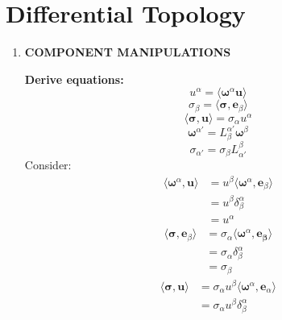 \documentclass[9pt]{report}
\begin{document}
\chapter{Differential Topology}
\begin{enumerate}
  \item \textbf{COMPONENT MANIPULATIONS}

  \textbf{Derive equations:}
  \begin{equation}
    u^\alpha = \langle \boldsymbol{\omega}^\alpha \boldsymbol{u} \rangle
  \end{equation}
  \begin{equation}
    \sigma_\beta = \langle \boldsymbol{\sigma}, \boldsymbol{e}_\beta \rangle
  \end{equation}
  \begin{equation}
    \langle \boldsymbol{\sigma}, \boldsymbol{u} \rangle = \sigma_\alpha u^\alpha
  \end{equation}
  \begin{equation}
    \boldsymbol{\omega}^{\alpha'} = L^{\alpha'}_\beta \boldsymbol{\omega}^\beta 
  \end{equation}
  \begin{equation}
    \sigma_{\alpha'} = \sigma_\beta L^\beta_{\alpha'}
  \end{equation}
  Consider:
  \[
    \begin{align}
      \langle \boldsymbol{\omega}^\alpha, \boldsymbol{u} \rangle &= u^\beta \langle \boldsymbol{\omega}^\alpha, \boldsymbol{e}_\beta \rangle \\
                                                                 &= u^\beta \delta^\alpha_\beta \\
                                                                 &= u^\alpha
    \end{align}
  \]
  \[
    \begin{align}
      \langle \boldsymbol{\sigma}, \boldsymbol{e}_\beta \rangle &= \sigma_\alpha \langle \boldsymbol{\omega}^\alpha, \boldsymbol{e_\beta} \rangle \\
      &= \sigma_\alpha \delta^\alpha_\beta \\
      &= \sigma_\beta
    \end{align}
  \]
  \[
  \]
  \[
    \begin{align}
      \langle \boldsymbol{\sigma}, \boldsymbol{u} \rangle &= \sigma_\alpha u^\beta \langle \boldsymbol{\omega}^\alpha, \boldsymbol{e}_\alpha \rangle\\
                                                          &= \sigma_\alpha u^\beta \delta^\alpha_\beta \\

\end{align}\]
\end{enumerate}
\end{document}
